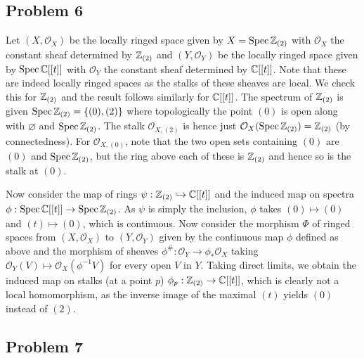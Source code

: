 \documentclass{../../mathnotes}
\begin{document}
\subsection*{Problem 6}

Let $(X,\mathcal{O}_X)$ be the locally ringed space given by $X=\operatorname{Spec}\mathbb{Z}_{(2)}$ with $\mathcal{O}_X$ the constant sheaf determined by $\mathbb{Z}_{(2)}$
and $(Y,\mathcal{O}_Y)$ be the locally ringed space given by $\operatorname{Spec} \mathbb{C}[ [t]]$ with $\mathcal{O}_Y$ the constant sheaf determined by $\mathbb{C}[ [t]]$.
Note that these are indeed locally ringed spaces as the stalks of these sheaves are local. We check this for $\mathbb{Z}_{(2)}$ and the result follows
similarly for $\mathbb{C}[ [t]]$. The spectrum of $\mathbb{Z}_{(2)}$ is given $\operatorname{Spec} \mathbb{Z}_{(2)}=\{(0),(2)\}$ where topologically the point $(0)$ is open along with
$\varnothing$ and $\operatorname{Spec} \mathbb{Z}_{(2)}$. The stalk $\mathcal{O}_{X,(2)}$ is hence just $\mathcal{O}_{X}(\operatorname{Spec}\mathbb{Z}_{(2)})=\mathbb{Z}_{(2)}$ (by connectedness).
For $\mathcal{O}_{X,(0)}$, note that the two open sets containing $(0)$ are $(0)$ and $\operatorname{Spec}\mathbb{Z}_{(2)}$, but the ring above each of these is $\mathbb{Z}_{(2)}$
and hence so is the stalk at $(0)$.

Now consider the map of rings $\psi:\mathbb{Z}_{(2)}\hookrightarrow\mathbb{C}[ [t]]$ and the induced map on spectra $\phi:\operatorname{Spec}\mathbb{C}[ [t]]\to\operatorname{Spec}\mathbb{Z}_{(2)}$.
As $\psi$ is simply the inclusion, $\phi$ takes $(0)\mapsto (0)$ and $(t)\mapsto (0)$, which is continuous.
Now consider the morphism $\Phi$ of ringed spaces from $(X,\mathcal{O}_X)$ to $(Y,\mathcal{O}_Y)$ given by the continuous map
$\phi$ defined as above and the morphism of sheaves $\phi^\#:\mathcal{O}_Y\to\phi_*\mathcal{O}_X$ taking $\mathcal{O}_Y(V)\mapsto \mathcal{O}_X(\phi^{-1}V)$
for every open $V$ in $Y$. Taking direct limits, we obtain the induced map on stalks (at a point $p$) $\phi_p:\mathbb{Z}_{(2)}\to\mathbb{C}[ [t]]$, which is clearly
not a local homomorphism, as the inverse image of the maximal $(t)$ yields $(0)$ instead of $(2)$.

\subsection*{Problem 7}
\end{document}
